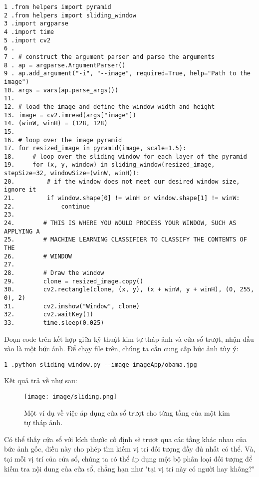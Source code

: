 \documentclass[12pt,a4paper]{article}
\begin{document}
\begin{lstlisting}
1 .from helpers import pyramid
2 .from helpers import sliding_window
3 .import argparse
4 .import time
5 .import cv2
6 .
7 . # construct the argument parser and parse the arguments
8 . ap = argparse.ArgumentParser()
9 . ap.add_argument("-i", "--image", required=True, help="Path to the image")
10. args = vars(ap.parse_args())
11.
12. # load the image and define the window width and height
13. image = cv2.imread(args["image"])
14. (winW, winH) = (128, 128)
15.
16. # loop over the image pyramid
17. for resized_image in pyramid(image, scale=1.5):
18.     # loop over the sliding window for each layer of the pyramid
19.     for (x, y, window) in sliding_window(resized_image, stepSize=32, windowSize=(winW, winH)):
20.         # if the window does not meet our desired window size, ignore it
21.         if window.shape[0] != winH or window.shape[1] != winW:
22.             continue
23.
24.        # THIS IS WHERE YOU WOULD PROCESS YOUR WINDOW, SUCH AS APPLYING A
25.        # MACHINE LEARNING CLASSIFIER TO CLASSIFY THE CONTENTS OF THE
26.        # WINDOW
27.
28.        # Draw the window
29.        clone = resized_image.copy()
30.        cv2.rectangle(clone, (x, y), (x + winW, y + winH), (0, 255, 0), 2)
31.        cv2.imshow("Window", clone)
32.        cv2.waitKey(1)
33.        time.sleep(0.025)
\end{lstlisting}

Đoạn code trên kết hợp giữa kỹ thuật kim tự tháp ảnh và cửa sổ trượt, nhận đầu vào là một bức ảnh. Để chạy file trên, chúng ta cần cung cấp bức ảnh tùy ý:
\begin{lstlisting}
1 .python sliding_window.py --image imageApp/obama.jpg

\end{lstlisting}

Kết quả trả về như sau:
                \begin{figure}[H]
                    \centering
                    \texttt{[image: image/sliding.png]}
                    \caption{Một ví dụ về việc áp dụng cửa sổ trượt cho từng tầng của một kim tự tháp ảnh.}
                    \label{fig:my_label}
                \end{figure}

Có thể thấy cửa sổ với kích thước cố định sẽ trượt qua các tầng khác nhau của bức ảnh gốc, điều này cho phép tìm kiếm vị trí đối tượng  đầy đủ nhất có thể. Và, tại mỗi vị trí của cửa sổ, chúng ta có thể áp dụng một bộ phân loại đối tượng để kiếm tra nội dung của cửa sổ, chẳng hạn như "tại vị trí này có người hay không?"
\end{document}
